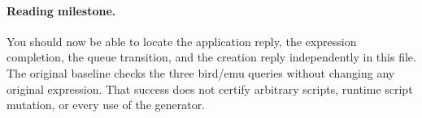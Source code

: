 \paragraph{Reading milestone.}
You should now be able to locate the application reply, the expression
completion, the queue transition, and the creation reply independently
in this file. The original baseline checks the three bird/emu queries
without changing any original expression.
That success does not certify arbitrary scripts, runtime script
mutation, or every use of the generator.
